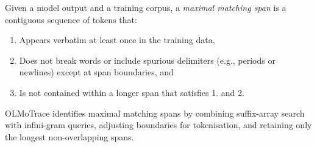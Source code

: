 \begin{definitionbox}
\label{def:maximal-matching-spans}
Given a model output and a training corpus, a \emph{maximal matching span} is a contiguous sequence of tokens that:
\begin{enumerate}
    \item Appears verbatim at least once in the training data,
    \item Does not break words or include spurious delimiters (e.g., periods or newlines) except at span boundaries, and
    \item Is not contained within a longer span that satisfies 1. and 2.
\end{enumerate}

OLMoTrace identifies maximal matching spans by combining suffix-array search with infini-gram queries, adjusting boundaries for tokenisation, and retaining only the longest non-overlapping spans.
\end{definitionbox}

